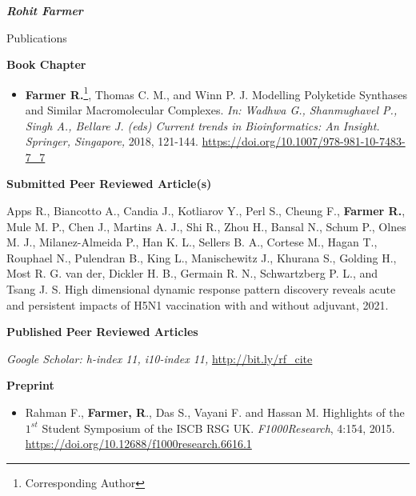 \documentclass[10pt]{article}
\begin{document}
\begin{cv}{\huge \it \bfseries Rohit Farmer}
\begin{cvlist}{Publications}
\vskip3pt
\item {\textbf{Book Chapter}}
\item {\begin{itemize}\item{\bf Farmer R.}\footnote{Corresponding Author}, Thomas C. M., and Winn P. J. Modelling Polyketide Synthases and Similar Macromolecular Complexes. \emph{In: Wadhwa G., Shanmughavel P., Singh A., Bellare J. (eds) Current trends in Bioinformatics: An Insight. Springer, Singapore,} 2018, 121-144. \url{https://doi.org/10.1007/978-981-10-7483-7_7} \end{itemize}}

\vskip3pt
\item {\textbf{Submitted Peer Reviewed Article(s)}}
\item {\begin{itemize}Apps R., Biancotto A., Candia J., Kotliarov Y., Perl S., Cheung F., \textbf{Farmer R.}, Mule M. P., Chen J., Martins A. J., Shi R., Zhou H., Bansal N., Schum P., Olnes M. J., Milanez-Almeida P., Han K. L., Sellers B. A., Cortese M., Hagan T., Rouphael N., Pulendran B., King L., Manischewitz J., Khurana S., Golding H., Most R. G. van der, Dickler H. B., Germain R. N., Schwartzberg P. L., and Tsang J. S. High dimensional dynamic response pattern discovery reveals acute and persistent impacts of H5N1 vaccination with and without adjuvant, 2021. \end{itemize}}

\vskip3pt
\item {\bf Published Peer Reviewed Articles}
\item {\textit{Google Scholar: h-index 11, i10-index 11,} \url{http://bit.ly/rf_cite}}
\vskip3pt
\item{ }

\vskip3pt
\item {\textbf{Preprint}}
\item {\begin{itemize}\item Rahman F., \textbf{Farmer, R}., Das S., Vayani F. and Hassan M. Highlights of the $1^{st}$ Student Symposium of the ISCB RSG UK. \emph{F1000Research}, 4:154, 2015. \url{https://doi.org/10.12688/f1000research.6616.1} \end{itemize}}

\end{cvlist}
\end{cv}
\end{document}
